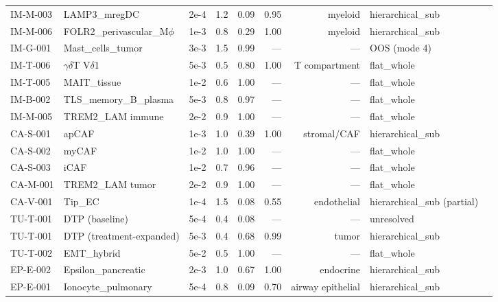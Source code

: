 \begin{table}[h]
\begin{tabular}{lllrrrrll}
IM-M-003 & LAMP3\_mregDC            & 2e-4 & 1.2 & 0.09 & 0.95 & myeloid          & hierarchical\_sub \\
IM-M-006 & FOLR2\_perivascular\_M$\phi$ & 1e-3 & 0.8 & 0.29 & 1.00 & myeloid     & hierarchical\_sub \\
IM-G-001 & Mast\_cells\_tumor       & 3e-3 & 1.5 & 0.99 & —    & —                & OOS (mode 4) \\
IM-T-006 & $\gamma\delta$T V$\delta$1    & 5e-3 & 0.5 & 0.80 & 1.00 & T compartment & flat\_whole \\
IM-T-005 & MAIT\_tissue             & 1e-2 & 0.6 & 1.00 & —    & —                & flat\_whole \\
IM-B-002 & TLS\_memory\_B\_plasma   & 5e-3 & 0.8 & 0.97 & —    & —                & flat\_whole \\
IM-M-005 & TREM2\_LAM immune        & 2e-2 & 0.9 & 1.00 & —    & —                & flat\_whole \\
CA-S-001 & apCAF                    & 1e-3 & 1.0 & 0.39 & 1.00 & stromal/CAF      & hierarchical\_sub \\
CA-S-002 & myCAF                    & 1e-2 & 1.0 & 1.00 & —    & —                & flat\_whole \\
CA-S-003 & iCAF                     & 1e-2 & 0.7 & 0.96 & —    & —                & flat\_whole \\
CA-M-001 & TREM2\_LAM tumor         & 2e-2 & 0.9 & 1.00 & —    & —                & flat\_whole \\
CA-V-001 & Tip\_EC                  & 1e-4 & 1.5 & 0.08 & 0.55 & endothelial      & hierarchical\_sub (partial) \\
TU-T-001 & DTP (baseline)           & 5e-4 & 0.4 & 0.08 & —    & —                & unresolved \\
TU-T-001 & DTP (treatment-expanded) & 5e-3 & 0.4 & 0.68 & 0.99 & tumor            & hierarchical\_sub \\
TU-T-002 & EMT\_hybrid              & 5e-2 & 0.5 & 1.00 & —    & —                & flat\_whole \\
EP-E-002 & Epsilon\_pancreatic      & 2e-3 & 1.0 & 0.67 & 1.00 & endocrine        & hierarchical\_sub \\
EP-E-001 & Ionocyte\_pulmonary      & 5e-4 & 0.8 & 0.09 & 0.70 & airway epithelial & hierarchical\_sub \\
\bottomrule
\end{tabular}
\end{table}
